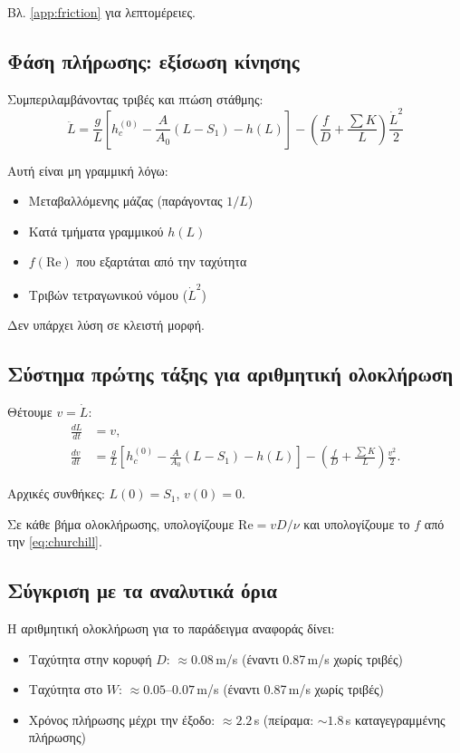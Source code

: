 \documentclass[11pt]{article}
\begin{document}
Βλ. \cref{app:friction} για λεπτομέρειες.

\subsection{Φάση πλήρωσης: εξίσωση κίνησης}

Συμπεριλαμβάνοντας τριβές και πτώση στάθμης:
\begin{equation}
  \boxed{\ddot{L} = \frac{g}{L}\left[h_c^{(0)} - \frac{A}{A_0}(L - S_1) - h(L)\right] - \left(\frac{f}{D} + \frac{\sum K}{L}\right)\frac{\dot{L}^2}{2}}
  \label{eq:filling-ODE}
\end{equation}

Αυτή είναι μη γραμμική λόγω:
\begin{itemize}[nosep,leftmargin=2em]
  \item Μεταβαλλόμενης μάζας (παράγοντας $1/L$)
  \item Κατά τμήματα γραμμικού $h(L)$
  \item $f(\text{Re})$ που εξαρτάται από την ταχύτητα
  \item Τριβών τετραγωνικού νόμου ($\dot{L}^2$)
\end{itemize}

Δεν υπάρχει λύση σε κλειστή μορφή.

\subsection{Σύστημα πρώτης τάξης για αριθμητική ολοκλήρωση}

Θέτουμε $v = \dot{L}$:
\begin{align}
  \frac{dL}{dt} &= v, \label{eq:system-L} \\
  \frac{dv}{dt} &= \frac{g}{L}\left[h_c^{(0)} - \frac{A}{A_0}(L - S_1) - h(L)\right] - \left(\frac{f}{D} + \frac{\sum K}{L}\right)\frac{v^2}{2}. \label{eq:system-v}
\end{align}

Αρχικές συνθήκες: $L(0) = S_1$, $v(0) = 0$.

Σε κάθε βήμα ολοκλήρωσης, υπολογίζουμε $\text{Re} = vD/\nu$ και υπολογίζουμε το $f$ από την \eqref{eq:churchill}.

\subsection{Σύγκριση με τα αναλυτικά όρια}

Η αριθμητική ολοκλήρωση για το παράδειγμα αναφοράς δίνει:
\begin{itemize}[nosep,leftmargin=2em]
  \item Ταχύτητα στην κορυφή $D$: $\approx 0.08$\,m/s (έναντι 0.87\,m/s χωρίς τριβές)
  \item Ταχύτητα στο $W$: $\approx 0.05$--$0.07$\,m/s (έναντι 0.87\,m/s χωρίς τριβές)
  \item Χρόνος πλήρωσης μέχρι την έξοδο: $\approx 2.2$\,s (πείραμα: $\sim 1.8$\,s καταγεγραμμένης πλήρωσης)
\end{itemize}
\end{document}

